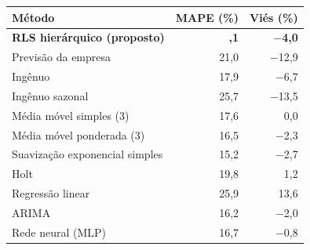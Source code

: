 \begin{tabular}{@{}lrr@{}}
\toprule
Método & MAPE (\%) & Viés (\%) \\
\midrule
\textbf{RLS hierárquico (proposto)} & \textbf{\boldmath 15,1} & \textbf{\boldmath $-$4,0} \\
Previsão da empresa & 21,0 & $-$12,9 \\
Ingênuo & 17,9 & $-$6,7 \\
Ingênuo sazonal & 25,7 & $-$13,5 \\
Média móvel simples (3) & 17,6 & 0,0 \\
Média móvel ponderada (3) & 16,5 & $-$2,3 \\
Suavização exponencial simples & 15,2 & $-$2,7 \\
Holt & 19,8 & 1,2 \\
Regressão linear & 25,9 & 13,6 \\
ARIMA & 16,2 & $-$2,0 \\
Rede neural (MLP) & 16,7 & $-$0,8 \\
\bottomrule
\end{tabular}
